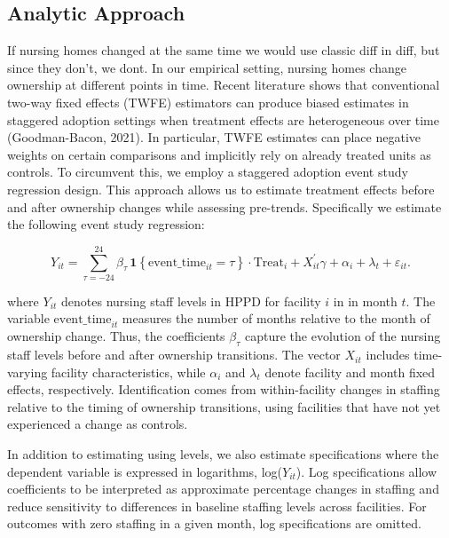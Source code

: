 \documentclass[preprint,authoryear]{elsarticle}
\begin{document}
\subsection{Analytic Approach}

If nursing homes changed at the same time we would use classic diff in diff, but since they don't, we dont. In our empirical setting, nursing homes change ownership at different points in time. Recent literature shows that conventional two-way fixed effects (TWFE) estimators can produce biased estimates in staggered adoption settings when treatment effects are heterogeneous over time (Goodman-Bacon, 2021). In particular, TWFE estimates can place negative weights on certain comparisons and implicitly rely on already treated units as controls. To circumvent this, we employ a staggered adoption event study regression design. This approach allows us to estimate treatment effects before and after ownership changes while assessing pre-trends. Specifically we estimate the following event study regression:

\begin{equation}
\label{eq:es_twfe}
Y_{it}
=
\sum_{\tau = -24}^{24}
    \beta_{\tau}\,
    \mathbf{1}\!\left\{ \text{event\_time}_{it} = \tau \right\}
    \cdot \text{Treat}_{i}
+
X_{it}^{\prime}\gamma
+
\alpha_i
+
\lambda_t
+
\varepsilon_{it}.
\end{equation}

where $Y_{it}$ denotes nursing staff levels in HPPD for facility $i$ in in month $t$. The variable $\text{event\_time}_{it}$ measures the number of months relative to the month of ownership change. Thus, the coefficients $\beta_{\tau}$ capture the evolution of the nursing staff levels before and after ownership transitions. The vector $X_{it}$ includes time-varying facility characteristics, while $\alpha_i$ and $\lambda_t$ denote facility and month fixed effects, respectively. Identification comes from within-facility changes in staffing relative to the timing of ownership transitions, using facilities that have not yet experienced a change as controls.

In addition to estimating using levels, we also estimate specifications where the dependent variable is expressed in logarithms, log($Y_{it}$). Log specifications allow coefficients to be interpreted as approximate percentage changes in staffing and reduce sensitivity to differences in baseline staffing levels across facilities. For outcomes with zero staffing in a given month, log specifications are omitted.
\end{document}
